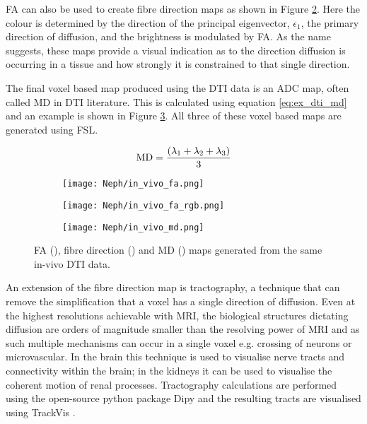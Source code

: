 \ac{FA} can also be used to create fibre direction maps as shown in Figure \ref{fig:ex_dti_fa_rgb}. Here the colour is determined by the direction of the principal eigenvector, $\epsilon_1$, the primary direction of diffusion, and the brightness is modulated by \ac{FA}. As the name suggests, these maps provide a visual indication as to the direction diffusion is occurring in a tissue and how strongly it is constrained to that single direction.

The final voxel based map produced using the \ac{DTI} data is an \ac{ADC} map, often called \ac{MD} in \ac{DTI} literature. This is calculated using equation \eqref{eq:ex_dti_md} and an example is shown in Figure \ref{fig:ex_dti_md}. All three of these voxel based maps are generated using \ac{FSL}.

\begin{equation}
	\textup{MD} = \frac{\left( \lambda_1 + \lambda_2 + \lambda_3 \right)}{3}
	\label{eq:ex_dti_md}
\end{equation}

\begin{figure}[H]
	\centering
	\begin{subfigure}[c]{0.31\textwidth}
		\centering
			\texttt{[image: Neph/in\_vivo\_fa.png]}
		\caption{}
		\label{fig:ex_dti_fa}
	\end{subfigure}
	\hfill
	\begin{subfigure}[c]{0.31\textwidth}
		\centering
			\texttt{[image: Neph/in\_vivo\_fa\_rgb.png]}
		\caption{}
		\label{fig:ex_dti_fa_rgb}
	\end{subfigure}
	\hfill	
	\begin{subfigure}[c]{0.31\textwidth}
		\centering
			\texttt{[image: Neph/in\_vivo\_md.png]}
		\caption{}
		\label{fig:ex_dti_md}
	\end{subfigure}
	\caption{\ac{FA} (), fibre direction () and \ac{MD} () maps generated from the same in-vivo \ac{DTI} data.}
	\label{fig:ex_dti_maps}
\end{figure}

An extension of the fibre direction map is tractography, a technique that can remove the simplification that a voxel has a single direction of diffusion. Even at the highest resolutions achievable with \ac{MRI}, the biological structures dictating diffusion are orders of magnitude smaller than the resolving power of \ac{MRI} and as such multiple mechanisms can occur in a single voxel e.g. crossing of neurons or microvascular. In the brain this technique is used to visualise nerve tracts and connectivity within the brain; in the kidneys it can be used to visualise the coherent motion of renal processes. Tractography calculations are performed using the open-source python package Dipy \cite{garyfallidis_dipy_2014} and the resulting tracts are visualised using TrackVis \cite{wang_diffusion_2007}.

